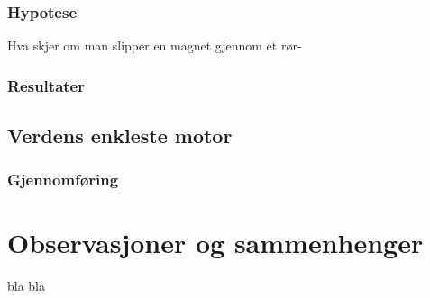 \documentclass[11pt]{article} %
\begin{document}
\subsubsection{Hypotese}

Hva skjer om man slipper en magnet gjennom et rør-
\subsubsection{Resultater}


\subsection{Verdens enkleste motor}

\subsubsection{Gjennomføring}


\section{Observasjoner og sammenhenger}
bla bla
\end{document}
